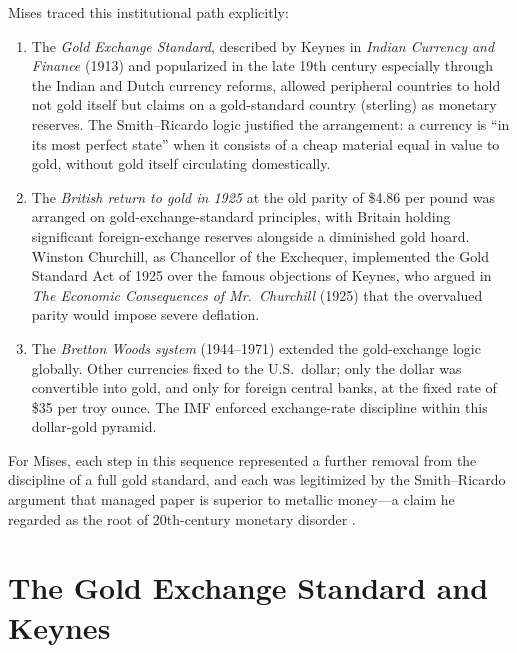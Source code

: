 \documentclass[12pt]{article}
\begin{document}
Mises traced this institutional path explicitly:

\begin{enumerate}
  \item  The \emph{Gold Exchange Standard}, described by Keynes in
         \textit{Indian Currency and Finance} (1913) and popularized
         in the late 19th century especially through the Indian and
         Dutch currency reforms, allowed peripheral countries to hold
         not gold itself but claims on a gold-standard country (sterling)
         as monetary reserves.  The Smith--Ricardo logic justified
         the arrangement: a currency is ``in its most perfect state''
         when it consists of a cheap material equal in value to gold,
         without gold itself circulating domestically.
  \item  The \emph{British return to gold in 1925} at the old parity
         of \$4.86 per pound was arranged on gold-exchange-standard
         principles, with Britain holding significant foreign-exchange
         reserves alongside a diminished gold hoard.  Winston Churchill,
         as Chancellor of the Exchequer, implemented the Gold Standard
         Act of 1925 over the famous objections of Keynes, who argued
         in \textit{The Economic Consequences of Mr.\ Churchill} (1925)
         that the overvalued parity would impose severe deflation.
  \item  The \emph{Bretton Woods system} (1944--1971) extended the
         gold-exchange logic globally.  Other currencies fixed to
         the U.S.\ dollar; only the dollar was convertible into gold,
         and only for foreign central banks, at the fixed rate of
         \$35 per troy ounce.  The IMF enforced exchange-rate
         discipline within this dollar-gold pyramid.
\end{enumerate}

For Mises, each step in this sequence represented a further
removal from the discipline of a full gold standard, and each was
legitimized by the Smith--Ricardo argument that managed paper
is superior to metallic money---a claim he regarded as the root
of 20th-century monetary disorder \citep{Mises1949,
Salerno1982}.

\section{The Gold Exchange Standard and Keynes}
\label{sec:ges}
\end{document}
